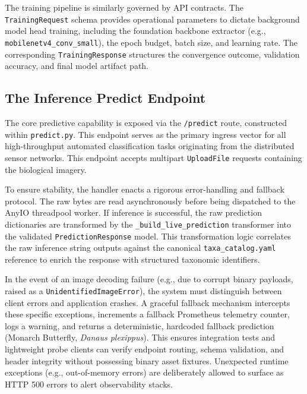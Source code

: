 The training pipeline is similarly governed by API contracts. The \texttt{TrainingRequest} schema provides operational parameters to dictate background model head training, including the foundation backbone extractor (e.g., \texttt{mobilenetv4\_conv\_small}), the epoch budget, batch size, and learning rate. The corresponding \texttt{TrainingResponse} structures the convergence outcome, validation accuracy, and final model artifact path.

\subsection{The Inference Predict Endpoint}

The core predictive capability is exposed via the \texttt{/predict} route, constructed within \texttt{predict.py}. This endpoint serves as the primary ingress vector for all high-throughput automated classification tasks originating from the distributed sensor networks. This endpoint accepts multipart \texttt{UploadFile} requests containing the biological imagery.

To ensure stability, the handler enacts a rigorous error-handling and fallback protocol. The raw bytes are read asynchronously before being dispatched to the AnyIO threadpool worker. If inference is successful, the raw prediction dictionaries are transformed by the \texttt{\_build\_live\_prediction} transformer into the validated \texttt{PredictionResponse} model. This transformation logic correlates the raw inference string outputs against the canonical \texttt{taxa\_catalog.yaml} reference to enrich the response with structured taxonomic identifiers.

In the event of an image decoding failure (e.g., due to corrupt binary payloads, raised as a \texttt{UnidentifiedImageError}), the system must distinguish between client errors and application crashes. A graceful fallback mechanism intercepts these specific exceptions, increments a fallback Prometheus telemetry counter, logs a warning, and returns a deterministic, hardcoded fallback prediction (Monarch Butterfly, \textit{Danaus plexippus}). This ensures integration tests and lightweight probe clients can verify endpoint routing, schema validation, and header integrity without possessing binary asset fixtures. Unexpected runtime exceptions (e.g., out-of-memory errors) are deliberately allowed to surface as HTTP 500 errors to alert observability stacks.


